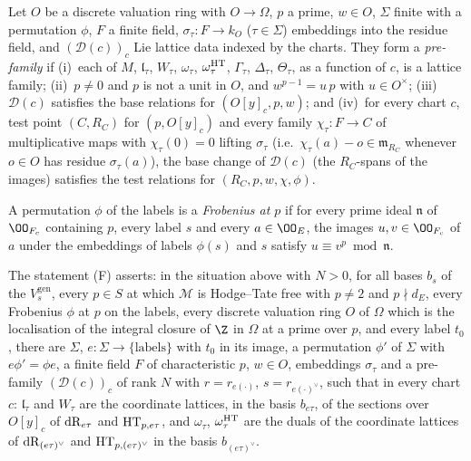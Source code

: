\begin{definition}\label{pf:tower:def-fam}
Let $O$ be a discrete valuation ring with $O\to\Omega$, $p$ a prime, $w\in O$, $\Sigma$ finite with a permutation
$\phi$, $F$ a finite field, $\sigma_\tau\colon F\to k_O$ ($\tau\in\Sigma$) embeddings into the residue field, and
$(\mathcal D(c))_c$ Lie lattice data indexed by the charts. They form a \emph{pre-family} if
(i)~each of $M$, $\mathfrak l_\tau$, $W_\tau$, $\omega_\tau$, $\omega^{\mathrm{HT}}_\tau$, $\Gamma_\tau$, $\Delta_\tau$,
$\Theta_\tau$, as a function of $c$, is a lattice family; (ii)~$p\ne0$ and $p$ is not a unit in $O$, and
$w^{p-1}=u\,p$ with $u\in O^\times$; (iii)~$\mathcal D(c)$ satisfies the base relations for $(O[y]_c,p,w)$; and
(iv)~for every chart $c$, test point $(C,R_C)$ for $(p,O[y]_c)$ and every family $\chi_\tau\colon F\to C$ of
multiplicative maps with $\chi_\tau(0)=0$ lifting $\sigma_\tau$ (i.e.\ $\chi_\tau(a)-o\in\mathfrak m_{R_C}$ whenever
$o\in O$ has residue $\sigma_\tau(a)$), the base change of $\mathcal D(c)$ (the $R_C$-spans of the images) satisfies
the test relations for $(R_C,p,w,\chi,\phi)$.

A permutation $\phi$ of the labels is a \emph{Frobenius at $p$} if for every prime ideal $\mathfrak n$ of $\OO_{F_c}$
containing $p$, every label $s$ and every $a\in\OO_E$, the images $u,v\in\OO_{F_c}$ of $a$ under the embeddings of
labels $\phi(s)$ and $s$ satisfy $u\equiv v^p\bmod\mathfrak n$.

The statement (F) asserts: in the situation above with $N>0$, for all bases $b_s$ of the $V^{\mathrm{gen}}_s$, every
$p\in S$ at which $\mathcal M$ is Hodge--Tate free with $p\ne2$ and $p\nmid d_E$, every Frobenius $\phi$ at $p$ on the
labels, every discrete valuation ring $O$ of $\Omega$ which is the localisation of the integral closure of $\Z$ in
$\Omega$ at a prime over $p$, and every label $t_0$, there are $\Sigma$, $e\colon\Sigma\to\{\text{labels}\}$ with $t_0$
in its image, a permutation $\phi'$ of $\Sigma$ with $e\phi'=\phi e$, a finite field $F$ of characteristic $p$, $w\in O$,
embeddings $\sigma_\tau$ and a pre-family $(\mathcal D(c))_c$ of rank $N$ with $r=r_{e(\cdot)}$,
$s=r_{e(\cdot)^\vee}$, such that in every chart $c$: $\mathfrak l_\tau$ and $W_\tau$ are the coordinate lattices, in the
basis $b_{e\tau}$, of the sections over $O[y]_c$ of $\mathrm{dR}_{e\tau}$ and $\mathrm{HT}_{p,e\tau}$, and $\omega_\tau$,
$\omega^{\mathrm{HT}}_\tau$ are the duals of the coordinate lattices of $\mathrm{dR}_{(e\tau)^\vee}$ and
$\mathrm{HT}_{p,(e\tau)^\vee}$ in the basis $b_{(e\tau)^\vee}$.
\end{definition}

